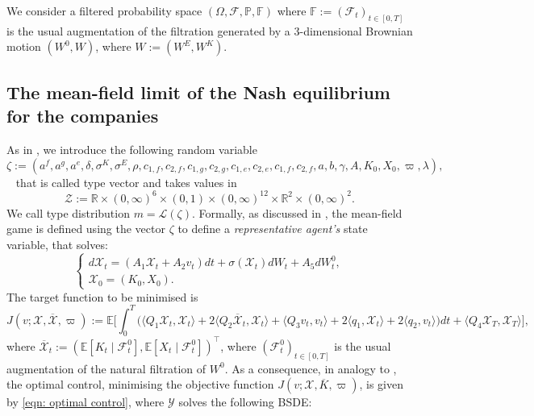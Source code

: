 \documentclass[10pt,a4paper]{amsart}
\numberwithin{equation}{section}
\newcommand{\w}{\varpi}
\newcommand{\E}{\mathbb{E}}
\newcommand{\F}{\mathbb{F}}
\newcommand{\R}{\mathbb{R}}
\newcommand{\ItF}{\mathcal{F}}
\newcommand{\prob}{\mathbb{P}}
\renewcommand{\bar}{\overline}
\begin{document}
We consider a filtered probability space $(\Omega, \ItF,\prob,\F)$ where $\F:= (\ItF_t)_{t\in[0,T]}$ is the usual augmentation of the filtration generated by a $3$-dimensional Brownian motion $(W^0,W)$, where $W := (W^E,W^K)$.



\subsection{The mean-field limit of the Nash equilibrium for the companies}
\label{subsection: mf companies game}
As in \cite{lacker2019mean}, we introduce the following random variable 
\begin{equation*}
\zeta:= (a^f,a^g,a^e,\delta,\sigma^K,\sigma^E,\rho,c_{1,f},c_{2,f},c_{1,g},c_{2,g},c_{1,e},c_{2,e},c_{1,f},c_{2,f},a,b,\gamma,A,K_0, X_0,\w,\lambda),
\end{equation*} 
that is called type vector and takes values in 
\begin{equation*}
\mathcal{Z}:= \R\times (0,\infty)^6 \times(0,1) \times (0,\infty)^{12} \times \R^2 \times (0,\infty)^2.
\end{equation*}
We call type distribution $m = \mathcal{L}(\zeta)$. 
Formally, as discussed in \cite[Section 3]{lacker2019mean}, the mean-field game is defined using the vector $\zeta$ to define a \emph{representative agent's} state variable, that solves: 
\begin{equation}
\label{eqn: mf state variable}
\begin{cases}
d\mathcal{X}_t = ( A_1 \mathcal{X}_t + A_2v_t)dt + \sigma(\mathcal{X}_t)dW_t + A_5dW^0_t,\\
\mathcal{X}_0=( K_0,X_0).
\end{cases}
\end{equation}
The target function to be minimised is
\begin{equation}
\label{eqn: mf target function}
J(v; \mathcal{X}, \bar{\mathcal{X}}, \w) := \E\bigg[\int_0^T \bigg(\langle Q_1 \mathcal{X}_t ,\mathcal{X}_t\rangle+ 2\langle Q_2 \bar{\mathcal{X}}_t, \mathcal{X}_t\rangle + \langle Q_3 v_t, v_t\rangle + 2\langle q_1, \mathcal{X}_t\rangle + 2 \langle q_2,v_t\rangle \bigg)dt + \langle Q_4\mathcal{X}_T, \mathcal{X}_T\rangle\bigg],
\end{equation}
where $\bar{\mathcal{X}}_t := (\E[K_t \mid \mathcal{F}^0_t],\E[X_t\mid \mathcal{F}^0_t])^\top$, where $(\mathcal{F}^0_t)_{t\in[0,T]}$ is the usual augmentation of the natural filtration of $W^0$. As a consequence, in analogy to \cite[Section 4]{del2024mean}, the optimal control, minimising the objective function $J(v; \mathcal{X}, \bar{K}, \w)$, is given by \eqref{eqn: optimal control}, where $\mathcal{Y}$ solves the following BSDE: 
\end{document}
